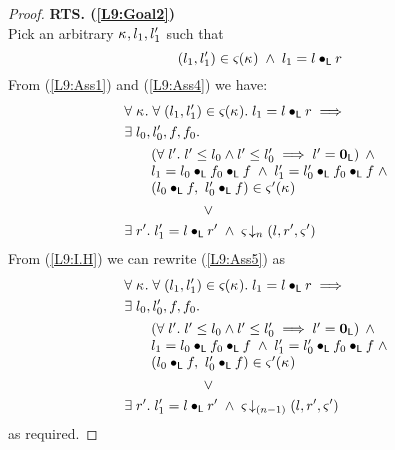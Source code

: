 \begin{lemma}[]
\begin{proof}
\noindent\textbf{RTS. (\ref{L9:Goal2})}\\
Pick an arbitrary $\kappa_{}, l_1, l'_1$ such that
%
\begin{equation}
	(l_1, l'_1) \in \varsigma_{}(\kappa_{}) \;\land\;  l_1 = l \bullet_{\textsf{L}} r   \label{L9:Ass4}
\end{equation}
%
From (\ref{L9:Ass1}) and (\ref{L9:Ass4}) we have:
%
\begin{align}
	&\for{\ca{}} \for{(l_1, l'_1) \in \amod{}(\ca{})} l_1 = l \composeL r \implies \nonumber\\
	&\exsts{l_0, l'_0, f, f_0} \nonumber\\
  &\hspace*{0.5cm}
  \begin{array}{l}
  	\left(\for{l'} l' \leq l_0 \land l' \leq l'_0 \implies l' = \unitL \right)\;\land\\
  	l_1 = l_0 \composeL f_0 \composeL f \;\land\; l'_1 = l'_0 \composeL f_0 \composeL f \;\land\\
  	(l_0 \composeL f,\ l'_0 \composeL f) \in \amod{}'(\ca{}) 
  \end{array} \nonumber\\
%
	&\hspace*{2cm}\lor  \nonumber\\
	&\exsts{r'} l'_1 = l \composeL r' \;\land\; \extendsAMUpto{\amod}{n}{l}{r'}{\amod{}'} \label{L9:Ass5}
\end{align}
%
From (\ref{L9:I.H}) we can rewrite (\ref{L9:Ass5}) as
%
\begin{align}
	&\for{\ca{}} \for{(l_1, l'_1) \in \amod{}(\ca{})} l_1 = l \composeL r \implies \nonumber\\
	&\exsts{l_0, l'_0, f, f_0} \nonumber\\
  &\hspace*{0.5cm}
  \begin{array}{l}
  	\left(\for{l'} l' \leq l_0 \land l' \leq l'_0 \implies l' = \unitL \right)\;\land\\
  	l_1 = l_0 \composeL f_0 \composeL f \;\land\; l'_1 = l'_0 \composeL f_0 \composeL f  \;\land\\
  	(l_0 \composeL f,\ l'_0 \composeL f) \in \amod{}'(\ca{}) 
  \end{array} \nonumber\\
%
	&\hspace*{2cm}\lor  \nonumber\\
	&\exsts{r'} l'_1 = l \composeL r' \;\land\; \extendsAMUpto{\amod}{(n-1)}{l}{r'}{\amod{}'} \label{L9:Ass6}
\end{align}
%
as required.
\end{proof}
\end{lemma}
